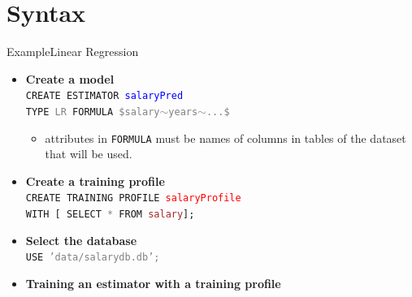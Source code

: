 \documentclass[handout, xcolor={dvipsnames}]{beamer}
\begin{document}
\section{Syntax}
\begin{frame}{Example}{Linear Regression}
  \begin{itemize}
  \item<1-> {
   \textbf{Create a model}
   \\
  }
  \texttt{CREATE ESTIMATOR \textcolor{blue}{salaryPred} \\ TYPE \textcolor{Gray}{LR} FORMULA
  \textcolor{Gray}{\$salary$\sim$years$\sim$...\$} }
  \begin{itemize}
      \item attributes in \texttt{FORMULA} must be names of columns in tables of the dataset that will be used.
  \end{itemize}
  \vspace{.1in}
  \item<2->{
  \textbf{Create a training profile}
  \\
  \texttt{CREATE TRAINING PROFILE \textcolor{red}{salaryProfile} \\ 
  WITH [ SELECT \textcolor{Gray}{*} FROM \textcolor{brown}{salary}];}
  }
  \vspace{.1in}
  \item<3->{
  \textbf{Select the database}
  \\
  \texttt{USE \textcolor{Gray}{'data/salarydb.db';}}
  }  
  \vspace{.1in}
  \item<4->{
 \textbf{ Training an estimator with a training profile}
  \\
  
  }
  \end{itemize}
\end{frame}
\end{document}
